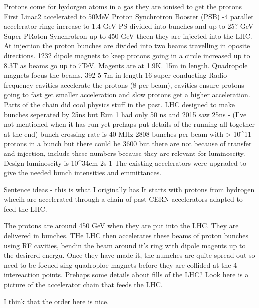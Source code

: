 Protons come for hydorgen atoms in a gas they are ionised to get the protons
First Linac2 accelerated to 50MeV Proton Synchrotron Booster (PSB) -4 parallet accelerator ringe increase to 1.4 GeV
PS divided into bunches and up to 25? GeV
Super PRoton Synchrotron up to 450 GeV theen they are injected into the LHC. At injection the proton bunches are divided into two beams travelling in oposite directions.
1232 dipole magnets to keep protons going in a circle increased up to 8.3T as beams go up to 7TeV. Magents are at 1.9K. 15m in length.
Quadropole magnets focus the beams. 392 5-7m in length
16 super conducting Radio frequency cavities accelerate the protons (8 per beam), cavities ensure protons going to fast get smaller acceleration and slow protons get a higher acceleration.
Parts of the chain did cool physics stuff in the past.
LHC designed to make bunches seperated by 25ns but Run 1 had only 50 ns and 2015 saw 25ns - (I've not mentioned when it has run yet prehaps put details of the running all together at the end)
bunch crossing rate is 40 MHz
2808 bunches per beam with > 10^{11} protons in a bunch but there could be 3600 but there are not because of transfer and injection, include these numbers because they are relevant for luminoscity.
Design luminoscity is 10^34cm-2s-1
The existing accelerators were upgraded to give the needed bunch intensities and emmittances.


Sentence ideas - this is what I originally has
It starts with protons from hydrogen whccih are accelerated through a chain of past CERN accelerators adapted to feed the LHC. 

The protons are around 450 GeV when they are put into the LHC. They are delivered in bunches. THe LHC then accelerates these beams of proton bunches using RF cavities, bendin the beam around it's ring with dipole magents up to the desirerd energu. Once they have made it, the numches are quite spread out so need to be focued sing quadroploe magnets before they are collided at the 4 intereaction points. Prehaps some details about fills of the LHC? Look here is a picture of the accelerator chain that feeds the LHC.

I think that the order here is nice.



